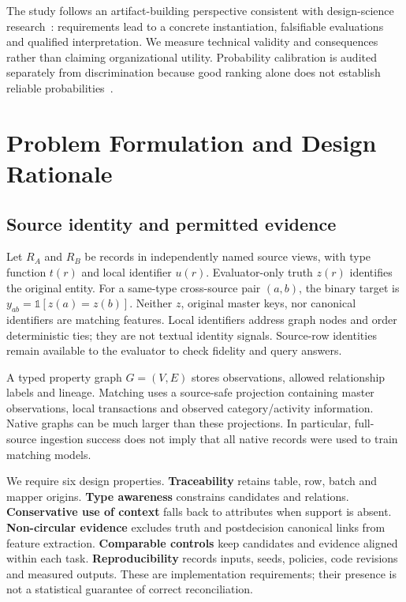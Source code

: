 \documentclass[11pt,letterpaper]{article}
\begin{document}
The study follows an artifact-building perspective consistent with design-science research~\cite{designscience}: requirements lead to a concrete instantiation, falsifiable evaluations and qualified interpretation. We measure technical validity and consequences rather than claiming organizational utility. Probability calibration is audited separately from discrimination because good ranking alone does not establish reliable probabilities~\cite{calibration}.

\section{Problem Formulation and Design Rationale}
\subsection{Source identity and permitted evidence}
Let $R_A$ and $R_B$ be records in independently named source views, with type function $t(r)$ and local identifier $u(r)$. Evaluator-only truth $z(r)$ identifies the original entity. For a same-type cross-source pair $(a,b)$, the binary target is $y_{ab}=\mathbb{1}[z(a)=z(b)]$. Neither $z$, original master keys, nor canonical identifiers are matching features. Local identifiers address graph nodes and order deterministic ties; they are not textual identity signals. Source-row identities remain available to the evaluator to check fidelity and query answers.

A typed property graph $G=(V,E)$ stores observations, allowed relationship labels and lineage. Matching uses a source-safe projection containing master observations, local transactions and observed category/activity information. Native graphs can be much larger than these projections. In particular, full-source ingestion success does not imply that all native records were used to train matching models.

We require six design properties. \textbf{Traceability} retains table, row, batch and mapper origins. \textbf{Type awareness} constrains candidates and relations. \textbf{Conservative use of context} falls back to attributes when support is absent. \textbf{Non-circular evidence} excludes truth and postdecision canonical links from feature extraction. \textbf{Comparable controls} keep candidates and evidence aligned within each task. \textbf{Reproducibility} records inputs, seeds, policies, code revisions and measured outputs. These are implementation requirements; their presence is not a statistical guarantee of correct reconciliation.
\end{document}

